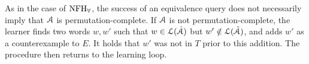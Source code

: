 As in the case of $\textrm{NFH}_{\forall}$, the success of an equivalence query does not necessarily imply that $\mathcal{A}$ is permutation-complete. 
If $\mathcal{A}$ is not permutation-complete, the learner finds two words $w,w'$ such that $w\in\mathcal{L}(\hat{\mathcal{A}})$ but $w'\notin\mathcal{L}(\hat{\mathcal{A}})$, and adds $w'$ as a counterexample to $E$. It holds that $w'$ was not in $T$ prior to this addition.
The procedure then returns to the learning loop.

